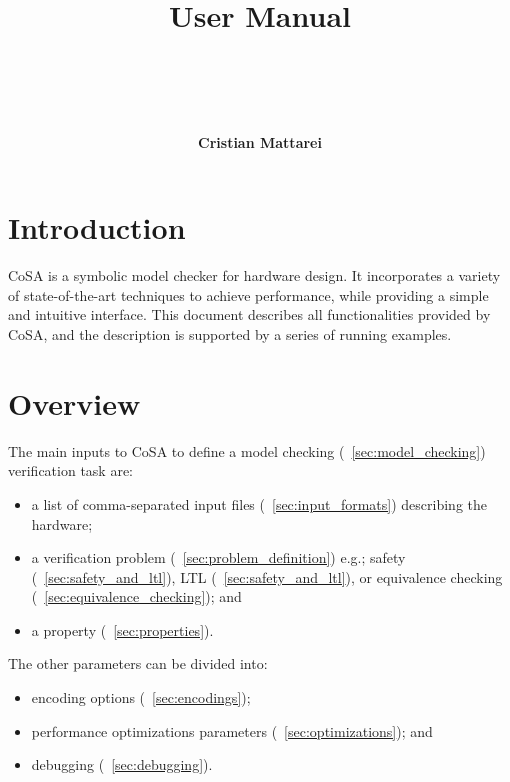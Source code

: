\documentclass{article}
\theoremstyle{definition}
\begin{document}
\title{\\ \vspace{1cm}User Manual}
\author{\\ \\ \\ \\ \textbf{Cristian Mattarei}}

\maketitle

\newpage
\tableofcontents

\newpage
\section*{Introduction}

CoSA is a symbolic model checker for hardware design. It incorporates
a variety of state-of-the-art techniques to achieve performance, while
providing a simple and intuitive interface. This document describes
all functionalities provided by CoSA, and the description is supported
by a series of running examples.

\section{Overview}

The main inputs to CoSA to define a model checking
(\textsection~\ref{sec:model_checking}) verification task are:
\begin{itemize}
\item a list of comma-separated input files
  (\textsection~\ref{sec:input_formats}) describing the hardware;
\item a verification problem
  (\textsection~\ref{sec:problem_definition}) e.g.; safety
  (\textsection~\ref{sec:safety_and_ltl}), LTL
  (\textsection~\ref{sec:safety_and_ltl}), or equivalence checking
  (\textsection~\ref{sec:equivalence_checking}); and
\item a property (\textsection~\ref{sec:properties}).
\end{itemize}

\noindent
The other parameters can be divided into:
\begin{itemize}
\item encoding options (\textsection~\ref{sec:encodings});
\item performance optimizations parameters
  (\textsection~\ref{sec:optimizations}); and
\item debugging (\textsection~\ref{sec:debugging}).
\end{itemize}
\end{document}
